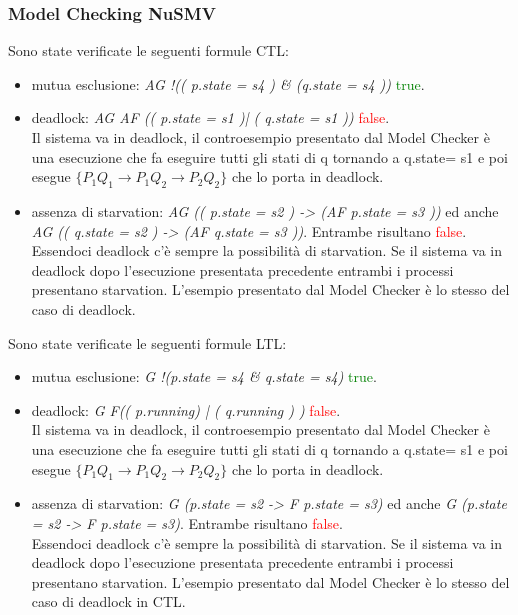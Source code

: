 \documentclass[a4paper]{article}
\begin{document}
\subsubsection{Model Checking NuSMV}
Sono state verificate le seguenti formule CTL:
\begin{itemize}
        \item mutua esclusione: \textit{AG !(( p.state = s4 ) \& (q.state = s4 ))} \textcolor{green}{true}.
        \item deadlock: \textit{AG AF (( p.state = s1 )| ( q.state = s1 ))} \textcolor{red}{false}.\\
		Il sistema va in deadlock, il controesempio presentato dal Model Checker è una esecuzione che fa eseguire tutti gli stati di q tornando a q.state= s1 e poi esegue $\{P_1Q_1 \rightarrow P_1Q_2 \rightarrow P_2Q_2\}$ che lo porta in deadlock.
        \item assenza di starvation: \textit{AG (( p.state = s2 ) -> (AF p.state = s3 ))} ed anche \textit{AG (( q.state = s2 ) -> (AF q.state = s3 ))}. Entrambe risultano \textcolor{red}{false}.\\
		Essendoci deadlock c'è sempre la possibilità di starvation. Se il sistema va in deadlock dopo l'esecuzione presentata precedente entrambi i processi presentano starvation.
		L'esempio presentato dal Model Checker è lo stesso del caso di deadlock.
\end{itemize}
Sono state verificate le seguenti formule LTL:
\begin{itemize}
        \item mutua esclusione: \textit{G !(p.state = s4 \& q.state = s4)} \textcolor{green}{true}.
        \item deadlock: \textit{G F(( p.running) | ( q.running ) )} \textcolor{red}{false}. \\
		Il sistema va in deadlock, il controesempio presentato dal Model Checker è una esecuzione che fa eseguire tutti gli stati di q tornando a q.state= s1 e poi esegue $\{P_1Q_1 \rightarrow P_1Q_2 \rightarrow P_2Q_2\}$ che lo porta in deadlock.
        \item assenza di starvation: \textit{G (p.state = s2 ->  F p.state = s3)} ed anche \textit{G (p.state = s2 ->  F p.state = s3)}. Entrambe risultano \textcolor{red}{false}.\\
		Essendoci deadlock c'è sempre la possibilità di starvation. Se il sistema va in deadlock dopo l'esecuzione presentata precedente entrambi i processi presentano starvation.
		L'esempio presentato dal Model Checker è lo stesso del caso di deadlock in CTL.
\end{itemize}
\end{document}
